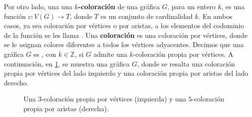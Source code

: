 Por otro lado, una una \textbf{$k$-coloraci\'on}
 de
una gr\'afica $G$, para un entero $k$, es una funci\'on $c \colon V(G)\to T$,
donde $T$ es un conjunto de cardinalidad $k$. En ambos casos, ya sea
coloraci\'on por v\'ertices o por aristas, a los elementos del codominio de la
funci\'on se les llama . Una \textbf{coloraci\'on}
 es una coloraci\'on por
v\'ertices, donde se le asignan colores diferentes a todos los v\'ertices
adyacentes. Decimos que una gr\'afica $G$ es
, con $k \in \mathbb{Z}$, si $G$ admite una
$k$-coloraci\'on propia por v\'ertices. A continuaci\'on, en
\cref{fig:ex-color-prop}, se muestra una gr\'afica $G$, donde se resalta una
coloraci\'on propia por v\'ertices del lado izquierdo y una coloraci\'on propia
por aristas del lado derecho. 

\begin{figure}[ht!]
    \centering
    \caption{Una $3$-coloraci\'on propia por v\'ertices (izquierda) y una
        $5$-coloraci\'on propia por aristas (derecha).}
        \label{fig:ex-color-prop}
\end{figure}

